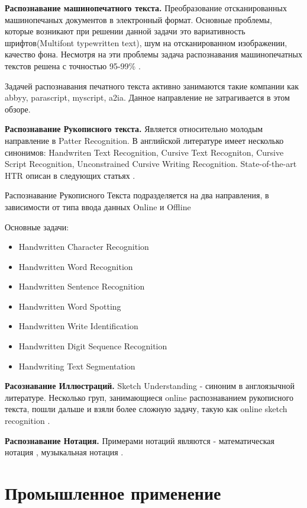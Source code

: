 \textbf{Распознавание машинопечатного текста.} Преобразование отсканированных машинопечаных документов в электронный формат. Основные проблемы, которые возникают при решении данной задачи это вариативность шрифтов(Multifont typewritten text), шум на отсканированном изображении, качество фона. Несмотря на эти проблемы задача распознавания машинопечатных текстов решена с точностью 95-99\% \cite{breuel2013high}.

Задачей распознавания печатного текста активно занимаются такие компании как abbyy, parascript, myscript, a2ia. Данное направление не затрагивается в этом обзоре.

\textbf{Распознавание Рукописного текста.} Является относительно молодым направление в Patter Recognition. В английской литературе имеет несколько синонимов: Handwriten Text Recognition, Cursive Text Recogniton, Cursive Script Recognition, Unconstrained Cursive Writing Recognition. State-of-the-art HTR описан в следующих статьях \cite{rehman2012off} \cite{bunke2003recognition} \cite{fujisawa2008forty} \cite{steinherz1999offline}.

Распознавание Рукописного Текста подразделяется на два направления, в зависимости от типа ввода данных Online и Offline

\noindent Основные задачи:
\begin{itemize}
  \item Handwritten Character Recognition
  \item Handwritten Word Recognition
  \item Handwritten Sentence Recognition
  \item Handwritten Word Spotting
  \item Handwritten Write Identification
  \item Handwritten Digit Sequence Recognition
  \item Handwriting Text Segmentation
\end{itemize}

\textbf{Расознавание Иллюстраций.} Sketch Understanding - синоним в англоязычной литературе. Несколько груп, занимающиеся online распознаванием рукописного текста, пошли дальше и взяли более сложную задачу, такую как online sketch recognition \cite{davis2007magic}.

\textbf{Распознавание Нотация.} Примерами нотаций являются - математическая нотация \cite{miyao2004online}, музыкальная нотация \cite{mitobe2004fast}.


\section{Промышленное применение} \label{sect1_2}

